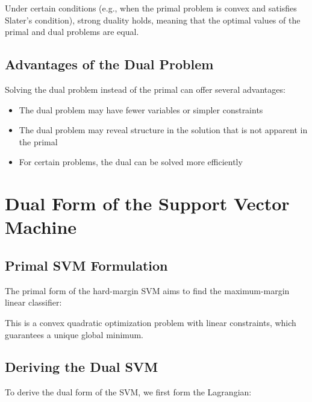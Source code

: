 \documentclass{article}
\begin{document}
Under certain conditions (e.g., when the primal problem is convex and satisfies Slater's condition), strong duality holds, meaning that the optimal values of the primal and dual problems are equal.

\subsection{Advantages of the Dual Problem}
Solving the dual problem instead of the primal can offer several advantages:

\begin{itemize}
    \item The dual problem may have fewer variables or simpler constraints
    \item The dual problem may reveal structure in the solution that is not apparent in the primal
    \item For certain problems, the dual can be solved more efficiently
\end{itemize}

\section{Dual Form of the Support Vector Machine}

\subsection{Primal SVM Formulation}
The primal form of the hard-margin SVM aims to find the maximum-margin linear classifier:


This is a convex quadratic optimization problem with linear constraints, which guarantees a unique global minimum.

\subsection{Deriving the Dual SVM}
To derive the dual form of the SVM, we first form the Lagrangian:
\end{document}
